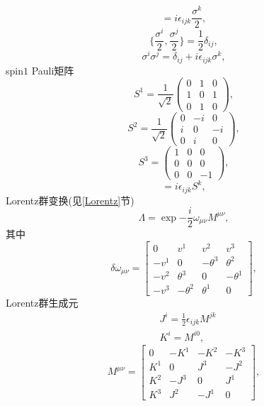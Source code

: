 \begin{equation}
    [\frac{\sigma^i}2, \frac{\sigma^j}2]=i\epsilon_{ijk}\frac{\sigma^k}2,
\end{equation}
\begin{equation}
    \{\frac{\sigma^i}2, \frac{\sigma^j}2\}=\frac12\delta_{ij},
\end{equation}
\begin{equation}
    \sigma^i\sigma^j=\delta_{ij}+i\epsilon_{ijk}\sigma^k,
\end{equation}
spin$1$ Pauli矩阵
\begin{equation}
    S^1=\frac{1}{\sqrt{2}}\begin{pmatrix}
        0 & 1 & 0\\
        1 & 0 & 1\\
        0 & 1 & 0
    \end{pmatrix},
\end{equation}
\begin{equation}
    S^2=\frac{1}{\sqrt{2}}\begin{pmatrix}
        0 & -i & 0\\
        i & 0 & -i\\
        0 & i & 0
    \end{pmatrix},
\end{equation}
\begin{equation}
    S^3=\begin{pmatrix}
        1 & 0 & 0\\
        0 & 0 & 0\\
        0 & 0 & -1
    \end{pmatrix},
\end{equation}
\begin{equation}
    [S^i, S^j]=i\epsilon_{ijk}S^k,
\end{equation}
Lorentz群变换(见\ref{Lorentz}节)
\begin{equation}
    \Lambda=\exp{-\frac i2\omega_{\mu\nu}M^{\mu\nu}},
\end{equation}
其中
\begin{equation}
    \delta\omega_{\mu\nu}=\begin{bmatrix}
        0 & v^1 & v^2 & v^3 \\
        -v^1 & 0 & -\theta^3 & \theta^2 \\
        -v^2 & \theta^3 & 0 & -\theta^1\\
        -v^3 & -\theta^2 & \theta^1 & 0
    \end{bmatrix},
\end{equation}
Lorentz群生成元
\begin{align}
    & J^i=\frac12\epsilon_{ijk}M^{jk}\\
    & K^i=M^{i0},
\end{align}
\begin{equation}
    M^{\mu\nu}=\begin{bmatrix}
        0 & -K^1 & -K^2 & -K^3\\
        K^1 & 0 & J^3 & -J^2\\
        K^2 & -J^3 & 0 & J^1\\
        K^3 & J^2 & -J^1 & 0
    \end{bmatrix},
\end{equation}


